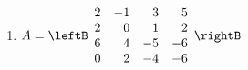 \begin{enumialphparenastyle}
\begin{ex}
\begin{enumerate}
\item 
$ A = \leftB \begin{array}{rrrr}
2 & -1 & 3 & 5 \\
2 & 0 & 1 & 2 \\
6 & 4 & -5 & -6 \\
0 & 2 & -4 & -6 
\end{array} \rightB$

\end{enumerate}
\end{ex}

\end{enumialphparenastyle}